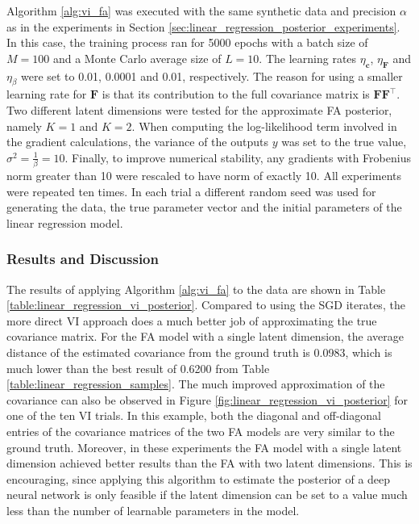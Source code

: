 \documentclass[msc,deptreport.inf]{infthesis} %
\newcommand{\matr}[1]{\mathbf{#1}}
\begin{document}
Algorithm \ref{alg:vi_fa} was executed with the same synthetic data and precision $\alpha$ as in the experiments in Section \ref{sec:linear_regression_posterior_experiments}. In this case, the training process ran for 5000 epochs with a batch size of $M=100$ and a Monte Carlo average size of $L=10$.  The learning rates $\eta_\matr{c}$,  $\eta_\matr{F}$ and $\eta_\beta$ were set to 0.01, 0.0001 and 0.01, respectively. The reason for using a smaller learning rate for $\matr{F}$ is that its contribution to the full covariance matrix is $\matr{F}\matr{F}^\intercal$. Two different latent dimensions were tested for the approximate FA posterior, namely $K=1$ and $K=2$. When computing the log-likelihood term involved in the gradient calculations, the variance of the outputs $y$ was set to the true value, $\sigma^2 = \frac{1}{\beta} = 10$. Finally, to improve numerical stability, any gradients with Frobenius norm greater than 10 were rescaled to have norm of exactly 10. All experiments were repeated ten times. In each trial a different random seed was used for generating the data, the true parameter vector and the initial parameters of the linear regression model. 

\subsubsection{Results and Discussion}

The results of applying Algorithm \ref{alg:vi_fa} to the data are shown in Table \ref{table:linear_regression_vi_posterior}. Compared to using the SGD iterates, the more direct VI approach does a much better job of approximating the true covariance matrix. For the FA model with a single latent dimension, the average distance of the estimated covariance from the ground truth is 0.0983, which is much lower than the best result of 0.6200 from Table \ref{table:linear_regression_samples}. The much improved approximation of the covariance can also be observed in Figure \ref{fig:linear_regression_vi_posterior} for one of the ten VI trials. In this example, both the diagonal and off-diagonal entries of the covariance matrices of the two FA models are very similar to the ground truth. Moreover, in these experiments the FA model with a single latent dimension achieved better results than the FA with two latent dimensions. This is encouraging, since applying this algorithm to estimate the posterior of a deep neural network is only feasible if the latent dimension can be set to a value much less than the number of learnable parameters in the model. 
\end{document}
